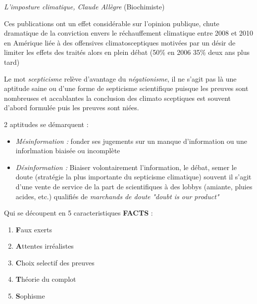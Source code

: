\documentclass {article}
\newcommand{\V}[0]{\vspace{1\baselineskip}}
\begin{document}
\textit{L'imposture climatique, Claude Allègre} (Biochimiste)
\V

Ces publications ont un effet considérable sur l'opinion publique, chute dramatique de la conviction envers le réchauffement climatique entre 2008 et 2010 en Amérique liée à des offensives climatosceptiques motivées par un désir de limiter les effets des traités alors en plein débat (50\% en 2006 35\% deux ans plus tard)
\V

Le mot \emph{scepticisme} relève d'avantage du \emph{négationisme}, il ne s'agit pas là une aptitude saine ou d'une forme de septicisme scientifique puisque les preuves sont nombreuses et accablantes la conclusion des climato sceptiques est souvent d'abord formulée puis les preuves sont niées.
\V

2 aptitudes se démarquent :
\begin{itemize}
\item \textit{Mésinformation :} fonder ses jugements sur un manque d'information ou une inforlmation biaisée ou incomplète
\item \textit{Désinformation :} Biaiser volontairement l'information, le débat, semer le doute (stratégie la plus importante du septicisme climatique) souvent il s'agit d'une vente de service de la part de scientifiques à des lobbys (amiante, pluies acides, etc.) qualifiés de \emph{marchands de doute} \emph{"doubt is our product"}
\end{itemize}
\V

Qui se découpent en 5 caracteristiques \textbf{FACTS} : 
\begin{enumerate}
\item \textbf{F}aux exerts
\item \textbf{A}ttentes irréalistes
\item \textbf{C}hoix selectif des preuves
\item \textbf{T}héorie du complot
\item \textbf{S}ophisme
\end{enumerate}
\V
\end{document}
